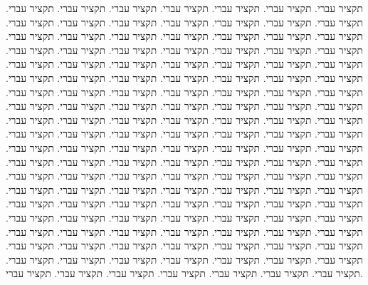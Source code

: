 תקציר עברי.  תקציר עברי.  תקציר עברי.  תקציר עברי.  תקציר עברי.  תקציר עברי.  תקציר עברי.  תקציר עברי.  תקציר עברי.  תקציר עברי.  תקציר עברי.  תקציר
עברי.  תקציר עברי.  תקציר עברי.  תקציר עברי.  תקציר עברי.  תקציר עברי.  תקציר עברי.  תקציר עברי.  תקציר עברי.  תקציר עברי.  תקציר עברי.  תקציר עברי.
תקציר עברי.  תקציר עברי.  תקציר עברי.  תקציר עברי.  תקציר עברי.  תקציר עברי.  תקציר עברי.  תקציר עברי.  תקציר עברי.  תקציר עברי.  תקציר עברי.  תקציר
עברי.  תקציר עברי.  תקציר עברי.  תקציר עברי.  תקציר עברי.  תקציר עברי.  תקציר עברי.  תקציר עברי.  תקציר עברי.  תקציר עברי.  תקציר עברי.  תקציר עברי.
תקציר עברי.  תקציר עברי.  תקציר עברי.  תקציר עברי.  תקציר עברי.  תקציר עברי.  תקציר עברי.  תקציר עברי.  תקציר עברי.  תקציר עברי.  תקציר עברי.  תקציר
עברי.  תקציר עברי.  תקציר עברי.  תקציר עברי.  תקציר עברי.  תקציר עברי.  תקציר עברי.  תקציר עברי.  תקציר עברי.  תקציר עברי.  תקציר עברי.  תקציר עברי.
תקציר עברי.  תקציר עברי.  תקציר עברי.  תקציר עברי.  תקציר עברי.  תקציר עברי.  תקציר עברי.  תקציר עברי.  תקציר עברי.  תקציר עברי.  תקציר עברי.  תקציר
עברי.  תקציר עברי.  תקציר עברי.  תקציר עברי.  תקציר עברי.  תקציר עברי.  תקציר עברי.  תקציר עברי.  תקציר עברי.  תקציר עברי.  תקציר עברי.  תקציר עברי.
תקציר עברי.  תקציר עברי.  תקציר עברי.  תקציר עברי.  תקציר עברי.  תקציר עברי.  תקציר עברי.  תקציר עברי.  תקציר עברי.  תקציר עברי.  תקציר עברי.  תקציר
עברי.  תקציר עברי.  תקציר עברי.  תקציר עברי.  תקציר עברי.  תקציר עברי.  תקציר עברי.  תקציר עברי.  תקציר עברי.  תקציר עברי.  תקציר עברי.  תקציר עברי.
תקציר עברי.  תקציר עברי.  תקציר עברי.  תקציר עברי.  תקציר עברי.  תקציר עברי.  תקציר עברי.  תקציר עברי.  תקציר עברי.  תקציר עברי.  תקציר עברי.  תקציר
עברי.  תקציר עברי.  תקציר עברי.  תקציר עברי.  תקציר עברי.  תקציר עברי.  תקציר עברי.  תקציר עברי.  תקציר עברי.  תקציר עברי.  תקציר עברי.  תקציר עברי.
תקציר עברי.  תקציר עברי.
